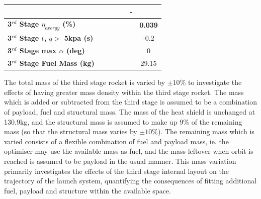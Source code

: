 \begin{table}[ht]
\begin{tabular}{l c c c c c c}
		& \secondFlightTimemThreeNinetyFiveNoReturn
		& \secondFlightTimemThreeStandardNoReturn
		& \secondFlightTimemThreeOneHundredFiveNoReturn
		& \secondFlightTimemThreeOneHundredTenNoReturn
		& -
		\\
		\hline 
		\textbf{3$^{rd}$ Stage $\eta_{exergy}$ (\%)}
		& \textbf{\thirddExergyEffmThreeNinetyNoReturn}
		& \textbf{\thirddExergyEffmThreeNinetyFiveNoReturn}
		& \textbf{\thirddExergyEffmThreeStandardNoReturn}
		& \textbf{\thirddExergyEffmThreeOneHundredFiveNoReturn}
		& \textbf{\thirddExergyEffmThreeOneHundredTenNoReturn}
		& \textbf{0.039}
		\\
		\textbf{3$^{rd}$ Stage $t$, $q >$ 5kpa (s)}
		& \thirdqOverFivemThreeNinetyNoReturn
		& \thirdqOverFivemThreeNinetyFiveNoReturn
		& \thirdqOverFivemThreeStandardNoReturn
		& \thirdqOverFivemThreeOneHundredFiveNoReturn
		& \thirdqOverFivemThreeOneHundredTenNoReturn
		&-0.2
		\\
		\textbf{3$^{rd}$ Stage max $\alpha$ (deg)}
		& \thirdmaxAoAmThreeNinetyNoReturn
		& \thirdmaxAoAmThreeNinetyFiveNoReturn
		& \thirdmaxAoAmThreeStandardNoReturn
		& \thirdmaxAoAmThreeOneHundredFiveNoReturn
		& \thirdmaxAoAmThreeOneHundredTenNoReturn
		&0
		\\
		\textbf{3$^{rd}$ Stage Fuel Mass (kg)}
		& \thirdmFuelmThreeNinetyNoReturn
		& \thirdmFuelmThreeNinetyFiveNoReturn
		& \thirdmFuelmThreeStandardNoReturn
		& \thirdmFuelmThreeOneHundredFiveNoReturn
		& \thirdmFuelmThreeOneHundredTenNoReturn
		&29.15
		\\
		\hline 
	\end{tabular} 
	
\end{table}


The total mass of the third stage rocket is varied by $\pm10\%$ to investigate the effects of having greater mass density within the third stage rocket. The mass which is added or subtracted from the third stage is assumed to be a combination of payload, fuel and structural mass. 
The mass of the heat shield is unchanged at 130.9kg, and the structural mass is assumed to make up 9\% of the remaining mass (so that the structural mass varies by $\pm10\%$). The remaining mass which is varied consists of a flexible combination of fuel and payload mass, ie. the optimiser may use the available mass as fuel, and the mass leftover when orbit is reached is assumed to be payload in the usual manner. 
This mass variation primarily investigates the effects of the third stage internal layout on the trajectory of the launch system, quantifying the consequences of fitting additional fuel, payload and structure within the available space.

